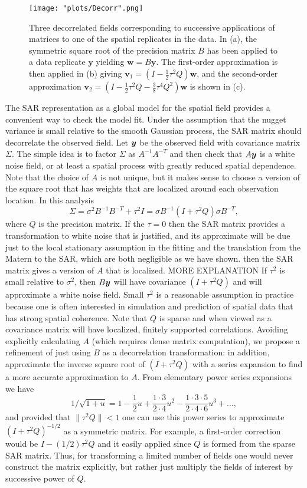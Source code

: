 \documentclass[review]{elsarticle}
\begin{document}
\begin{figure}
    \centering
    \texttt{[image: "plots/Decorr".png]} %
    \caption{Three decorrelated fields corresponding to successive applications of matrices to one of the spatial replicates in the data. In (a), the symmetric square root of the precision matrix $B$ has been applied to a data replicate $\mathbf y$ yielding $\mathbf w = B \mathbf y$. The first-order approximation is then applied in (b) giving $\mathbf v_1 =  (I - \frac{1}{2} \tau^2 Q)\mathbf w$, and the second-order approximation $\mathbf v_2 =  (I - \frac{1}{2} \tau^2 Q - \frac{3}{8} \tau^4 Q^2)\mathbf w$ is shown in (c).  }
    \label{f:6}
\end{figure}


The SAR representation as a global model for  the spatial field provides a convenient way to check the model fit.   Under the assumption that the nugget variance is small relative to the smooth Gaussian process, the SAR matrix should  decorrelate the observed field. 
Let $\mbox{\boldmath $y$}$ be the observed field with covariance matrix $\Sigma$. The simple idea is to factor $\Sigma$ as $A^{-1} A^{-T}$ and then  check that $A\mbox{\boldmath $y$}$ is a white noise field, or at least a spatial process with greatly reduced  spatial dependence. 
Note that the choice of $A$ is not unique, but it makes sense to choose a version of the square root that has weights that are localized around each observation location. In this analysis 
  \[ \Sigma=  \sigma^2 B^{-1} B^{-T} + \tau^2 I  = \sigma B^{-1}( I + \tau^2 Q ) \sigma B^{-T}, \]
where $Q$ is the precision matrix. If the $\tau= 0$ then the SAR matrix provides a transformation to white noise that is justified, and its approximate will be due just to the local stationary assumption in the fitting and the translation from the Matern to the SAR, which are both negligible as we have shown.
then the SAR matrix gives a version of $A$ that is localized. MORE EXPLANATION
If $\tau^2$ is small relative to $\sigma^2$, then $B\mbox{\boldmath $y$}$ will have covariance  $(I +  \tau^2Q)$ and will approximate a white noise field. Small $\tau^2$ is a reasonable assumption in practice because one is often interested in simulation and prediction of spatial data that has strong spatial coherence. Note that $Q$ is sparse and when viewed as a covariance matrix will have localized, finitely supported correlations. Avoiding explicitly calculating $A$ (which requires dense matrix computation), we propose a refinement of just using $B$ as a decorrelation transformation: in addition, approximate the inverse square root of $( I + \tau^2 Q )$ with a series expansion to find a more accurate approximation to $A$. 
From elementary power series expansions we have 
\[ 1/\sqrt{ 1 + u} =  1  - \frac{1}{2}u + \frac{1\cdot 3}{2 \cdot 4} u^2 - \frac{1 \cdot 3 \cdot 5}{2 \cdot 4 \cdot 6} u^3 + \ldots, \]
and provided that  $\| \tau^2 Q \| < 1$  one can use this power series to approximate  $(I + \tau^2 Q)^{-1/2}$ as a symmetric matrix. For example, a first-order correction would be $I - (1/2) \tau^2 Q $ and it easily applied since $Q$ is formed from the sparse SAR matrix. Thus, for transforming a limited number of fields one would never construct the matrix explicitly, but rather just multiply the fields of interest by successive power of $Q$.
\end{document}
